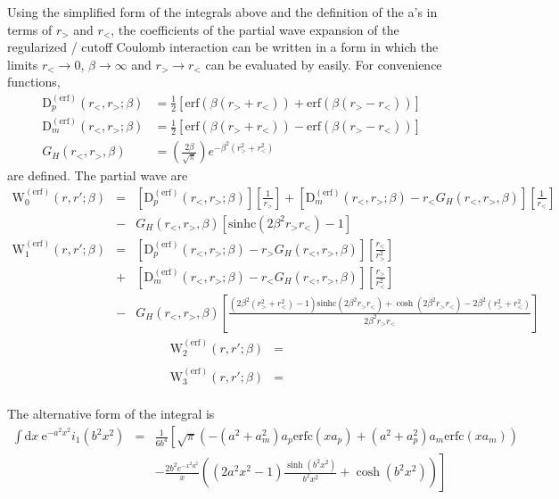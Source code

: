 \documentclass[paper=a4, fontsize=11pt]{article} %
\numberwithin{equation}{section} %
\numberwithin{figure}{section} %
\numberwithin{table}{section} %
\newcommand{\re}{{\mathrm{e}}}
\newcommand{\rerf}{{\mathrm{erf}}}
\newcommand{\rerfc}{{\mathrm{erfc}}}
\newcommand{\rd}{{\mathrm{d}}}
\newcommand{\PWerf}{\mathrm{W}^{(\mathrm{erf})}}
\newcommand{\sinhc}{\mathrm{sinhc}}
\newcommand{\rgt}{r_{>}}
\newcommand{\rlt}{r_{<}}
\newcommand{\Derfp}{\mathrm{D}^{(\mathrm{erf})}_p}
\newcommand{\Derfm}{\mathrm{D}^{(\mathrm{erf})}_m}
\begin{document}
Using the simplified form of the integrals above and the definition of the a's in terms of $\rgt$ and $\rlt$,
the coefficients of the partial wave expansion of the regularized / cutoff Coulomb interaction can be written in
a form in which the limits $\rlt\rightarrow 0$, $\beta\rightarrow \infty$ and $\rgt\rightarrow\rlt$ 
can be evaluated by easily.  For convenience functions,
\begin{equation}
\begin{split}
 \Derfp(\rlt,\rgt;\beta) &=\frac{1}{2}\left[\rerf(\beta (\rgt+\rlt))+\rerf(\beta (\rgt-\rlt))\right]\\
 \Derfm(\rlt,\rgt;\beta) &=\frac{1}{2}\left[\rerf(\beta (\rgt+\rlt))-\rerf(\beta (\rgt-\rlt))\right] \\
 G_H(\rlt,\rgt,\beta) &= \left(\frac{2\beta}{\sqrt{\pi}}\right) e^{-\beta^2(\rgt^2+\rlt^2)}
\end{split}
\end{equation}
are defined. The partial wave are
\begin{eqnarray}
\PWerf_0(r,r';\beta) &=& 
 \left[\Derfp(\rlt,\rgt;\beta)\right]\left[\frac{1}{\rgt}\right] 
+\left[\Derfm(\rlt,\rgt;\beta)-\rlt G_H(\rlt,\rgt,\beta)\right]\left[\frac{1}{\rlt}\right] \\
&-& G_H(\rlt,\rgt,\beta)
   \left [\sinhc(2\beta^2 \rgt\rlt)-1\right ]
\nonumber
\end{eqnarray}
%
\begin{eqnarray}
  \PWerf_1(r,r';\beta) &=&
   \left[\Derfp(\rlt,\rgt;\beta) -\rgt G_H(\rlt,\rgt,\beta)\right]
   \left [\frac{\rlt}{\rgt^2} \right] \nonumber\\
&+&  \left [\Derfm(\rlt,\rgt;\beta)-\rlt G_H(\rlt,\rgt,\beta)\right]
     \left [\frac{\rgt}{\rlt^2} \right] \\
&-&  G_H(\rlt,\rgt,\beta)
    \left [\frac{ (2\beta^2(\rgt^2+\rlt^2)-1)\sinhc(2\beta^2\rgt\rlt) 
          + \cosh(2\beta^2\rgt\rlt)- 2\beta^2(\rgt^2+\rlt^2)}{2\beta^2\rgt\rlt}\right ]
\nonumber 
\end{eqnarray}
%
\begin{eqnarray}
\PWerf_2(r,r';\beta) &=&  \nonumber \\
\end{eqnarray}
%
\begin{eqnarray}
\PWerf_3(r,r';\beta) &=&  \nonumber \\
\end{eqnarray}

\clearpage
The alternative form of the integral is 
\begin{eqnarray}
\int \rd x\ \re^{-a^2x^2}i_{1}(b^2x^2)&=& \frac{1}{6b^4} 
\left [
  \sqrt{\pi}\left (-(a^2 + a_m^2) a_p \rerfc(x a_p)+(a^2 + a_p^2) a_m \rerfc(x a_m) \right) \right . \nonumber \\
& & \left .
- \frac{2b^2e^{-x^2 a^2}}{x} \left ((2 a^2 x^2 - 1)\frac{\sinh(b^2x^2)}{b^2x^2} + \cosh(b^2x^2) \right)
\right ]
\end{eqnarray}
\end{document}
